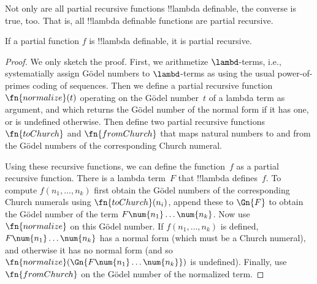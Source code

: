 \documentclass[../../../include/open-logic-section]{subfiles}
\begin{document}

Not only are all partial recursive functions !!{lambda definable}, the
converse is true, too. That is, all !!{lambda definable} functions are
partial recursive.

\begin{thm}
   If a partial function $f$ is
  !!{lambda definable}, it is partial recursive.
\end{thm}

\begin{proof}
  We only sketch the proof. First, we arithmetize $\lambd$-terms,
  i.e., systematially assign G\"odel numbers to $\lambd$-terms as
  using the usual power-of-primes coding of sequences.  Then we define
  a partial recursive function $\fn{normalize}(t)$ operating on the
  G\"odel number~$t$ of a lambda term as argument, and which returns
  the G\"odel number of the normal form if it has one, or is undefined
  otherwise.  Then define two partial recursive functions
  $\fn{toChurch}$ and $\fn{fromChurch}$ that maps natural numbers to
  and from the G\"odel numbers of the corresponding Church numeral.

  Using these recursive functions, we can define the function~$f$ as a
  partial recursive function. There is a lambda term~$F$ that
  !!{lambda define}s~$f$. To compute $f(n_1, \dots, n_k)$ first obtain
  the G\"odel numbers of the corresponding Church numerals using
  $\fn{toChurch}(n_i)$, append these to $\Gn{F}$ to obtain the G\"odel
  number of the term $F \num{n_1}\dots\num{n_k}$. Now use
  $\fn{normalize}$ on this G\"odel number. If $f(n_1, \dots, n_k)$ is
  defined, $F \num{n_1}\dots\num{n_k}$ has a normal form (which must
  be a Church numeral), and otherwise it has no normal form (and so
  $\fn{normalize}(\Gn{F\num{n_1}\dots\num{n_k}})$ is undefined).
  Finally, use $\fn{fromChurch}$ on the G\"odel number of the
  normalized term.
\end{proof}
\end{document}
